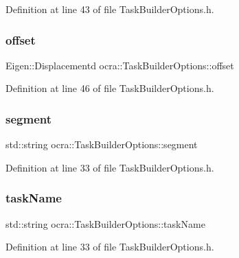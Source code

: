 Definition at line 43 of file Task\+Builder\+Options.\+h.

\hypertarget{classocra_1_1TaskBuilderOptions_a6c632afc050c25f7bb5631fbe7741c93}{}\label{classocra_1_1TaskBuilderOptions_a6c632afc050c25f7bb5631fbe7741c93} 
\subsubsection{\texorpdfstring{offset}{offset}}
{\footnotesize\ttfamily Eigen\+::\+Displacementd ocra\+::\+Task\+Builder\+Options\+::offset}



Definition at line 46 of file Task\+Builder\+Options.\+h.

\hypertarget{classocra_1_1TaskBuilderOptions_a49d0ad006ee4ef0a314d3eed9c995c06}{}\label{classocra_1_1TaskBuilderOptions_a49d0ad006ee4ef0a314d3eed9c995c06} 
\subsubsection{\texorpdfstring{segment}{segment}}
{\footnotesize\ttfamily std\+::string ocra\+::\+Task\+Builder\+Options\+::segment}



Definition at line 33 of file Task\+Builder\+Options.\+h.

\hypertarget{classocra_1_1TaskBuilderOptions_ab4d73eb287244b10f00c49f8641e0938}{}\label{classocra_1_1TaskBuilderOptions_ab4d73eb287244b10f00c49f8641e0938} 
\subsubsection{\texorpdfstring{task\+Name}{taskName}}
{\footnotesize\ttfamily std\+::string ocra\+::\+Task\+Builder\+Options\+::task\+Name}



Definition at line 33 of file Task\+Builder\+Options.\+h.

\hypertarget{classocra_1_1TaskBuilderOptions_ab0549ba26e607e200af4c596bccac8f8}{}\label{classocra_1_1TaskBuilderOptions_ab0549ba26e607e200af4c596bccac8f8} 
